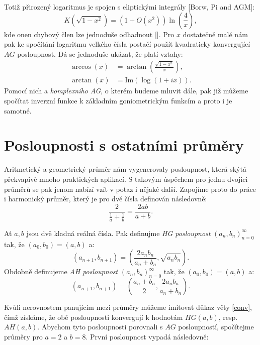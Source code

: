 \documentclass[12pt]{report}
\begin{document}
Totiž přirozený logaritmus je  spojen s eliptickými integrály [Borw, Pi and AGM]:
$$K(\sqrt{1-x^2}) = \left(1+O(x^2)\right)\ln\left(\frac{4}{x} \right),$$
kde onen chybový člen lze jednoduše odhadnout []. Pro $x$ dostatečně malé nám pak ke spočítání logaritmu velkého čísla postačí použít kvadraticky konvergující $AG$ posloupnost. Dá se jednoduše ukázat, že platí vztahy:
\begin{align*}
\arccos (x) &= \arctan\left(\frac{\sqrt{1-x^2}}{x} \right),\\
\arctan (x) &= \textrm{Im}(\log(1+ix)).
\end{align*}
Pomocí nich a \textit{komplexního AG}, o kterém budeme mluvit dále, pak již můžeme spočítat inverzní funkce k základním goniometrickým funkcím a proto i je samotné.




\section{Posloupnosti s ostatními průměry}

Aritmetický a geometrický průměr nám vygenerovaly posloupnost, která skýtá překvapivě mnoho praktických aplikací. S takovým úspěchem pro jednu dvojici průměrů se pak jenom nabízí vzít v potaz i nějaké další. Zapojíme proto do práce i harmonický průměr, který je pro dvě čísla definován následovně:
$$\frac{2}{\frac{1}{a}+\frac{1}{b}} = \frac{2ab}{a+b}.$$

\begin{definice}
Ať $a,b$ jsou dvě kladná reálná čísla. Pak definujme \textit{HG posloupnost} $(a_n,b_n)_{n=0}^{\infty}$ tak, že $(a_0,b_0) = (a,b)$ a:
$$\left(a_{n+1},b_{n+1} \right) = \left( \frac{2 a_n b_n}{a_n+b_n} , \sqrt{a_n b_n} \right).$$
Obdobně definujeme \textit{AH posloupnost}  $(a_n,b_n)_{n=0}^{\infty}$ tak, že $(a_0,b_0) = (a,b)$ a:
$$\left(a_{n+1},b_{n+1} \right) = \left( \frac{a_n+b_n}{2}, \frac{2 a_n b_n}{a_n+b_n} \right).$$
\end{definice}
Kvůli nerovnostem panujícím mezi průměry můžeme imitovat důkaz věty \ref{conv}, čímž získáme, že obě posloupnosti konvergují k hodnotám $HG(a,b)$, resp. $AH(a,b)$. Abychom tyto posloupnosti porovnali s $AG$ posloupností, spočítejme průměry pro $a=2$ a $b=8$. První posloupnost vypadá následovně:
\end{document}
